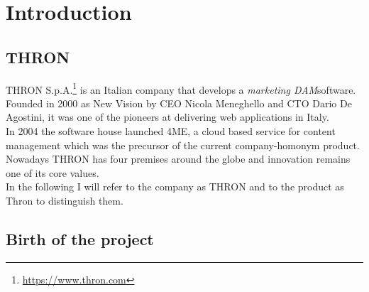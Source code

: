 
\chapter{Introduction}
\label{chap:introduction}


\section{THRON}

THRON S.p.A.\footnote{\url{https://www.thron.com}} is an Italian company that develops a \emph{\gls{marketing DAM}}\glsfirstoccur software. Founded in 2000 as New Vision by CEO Nicola Meneghello and CTO Dario De Agostini, it was one of the pioneers at delivering web applications in Italy. \\
In 2004 the software house launched 4ME, a cloud based service for content management which was the precursor of the current company-homonym product. \\
Nowadays THRON has four premises around the globe and innovation remains one of its core values.\\
In the following I will refer to the company as THRON and to the product as Thron to distinguish them.

\section{Birth of the project}

